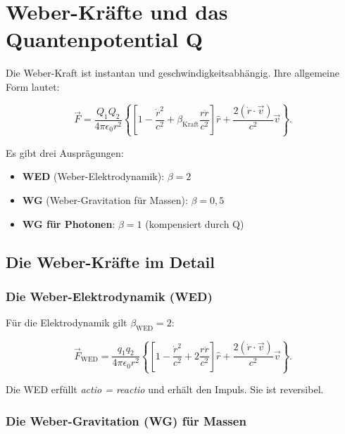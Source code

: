 \chapter{Weber-Kräfte und das Quantenpotential Q}

Die Weber-Kraft ist instantan und geschwindigkeitsabhängig. Ihre allgemeine Form lautet:

\begin{equation}
\vec{F} = \frac{Q_1 Q_2}{4\pi \epsilon_0 r^2} \left\{ \left[ 1 - \frac{\dot{r}^2}{c^2} + \beta_{\text{Kraft}} \frac{r\ddot{r}}{c^2} \right] \hat{r} + \frac{2(\dot{r} \cdot \vec{v})}{c^2} \vec{v} \right\}. \tag{5.1}
\end{equation}

Es gibt drei Ausprägungen:

\begin{itemize}
    \item \textbf{WED} (Weber-Elektrodynamik): \( \beta = 2 \)
    \item \textbf{WG} (Weber-Gravitation für Massen): \( \beta = 0,5 \)
    \item \textbf{WG für Photonen}: \( \beta = 1 \) (kompensiert durch Q)
\end{itemize}

\section{Die Weber-Kräfte im Detail}

\subsection{Die Weber-Elektrodynamik (WED)}

Für die Elektrodynamik gilt \( \beta_{\text{WED}} = 2 \):

\begin{equation}
\vec{F}_{\text{WED}} = \frac{q_1 q_2}{4\pi \epsilon_0 r^2} \left\{ \left[ 1 - \frac{\dot{r}^2}{c^2} + 2\frac{r\ddot{r}}{c^2} \right] \hat{r} + \frac{2(\dot{r} \cdot \vec{v})}{c^2} \vec{v} \right\}. \tag{5.2}
\end{equation}

Die WED erfüllt \emph{actio = reactio} und erhält den Impuls. Sie ist reversibel.

\subsection{Die Weber-Gravitation (WG) für Massen}

